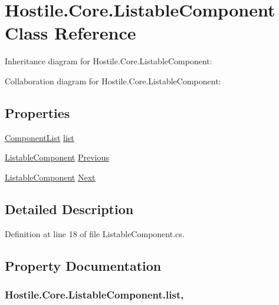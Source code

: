 \hypertarget{class_hostile_1_1_core_1_1_listable_component}{\section{Hostile.\-Core.\-Listable\-Component Class Reference}
\label{class_hostile_1_1_core_1_1_listable_component}
}


Inheritance diagram for Hostile.\-Core.\-Listable\-Component\-:


Collaboration diagram for Hostile.\-Core.\-Listable\-Component\-:
\subsection*{Properties}
\begin{DoxyCompactItemize}
\item 
\hyperlink{class_hostile_1_1_core_1_1_component_list}{Component\-List} \hyperlink{class_hostile_1_1_core_1_1_listable_component_ac5add9a4abc7969e44633099857e194c}{list}
\item 
\hyperlink{class_hostile_1_1_core_1_1_listable_component}{Listable\-Component} \hyperlink{class_hostile_1_1_core_1_1_listable_component_adc5c06457ac3a0d21602349789adb7fc}{Previous}
\item 
\hyperlink{class_hostile_1_1_core_1_1_listable_component}{Listable\-Component} \hyperlink{class_hostile_1_1_core_1_1_listable_component_a8983c35cc8a49a5e43d143ae9b4929bd}{Next}
\end{DoxyCompactItemize}


\subsection{Detailed Description}


Definition at line 18 of file Listable\-Component.\-cs.



\subsection{Property Documentation}
\hypertarget{class_hostile_1_1_core_1_1_listable_component_ac5add9a4abc7969e44633099857e194c}{
\subsubsection[{list}]{ Hostile.\-Core.\-Listable\-Component.\-list\hspace{0.3cm}{\ttfamily [get]}, {\ttfamily [set]}}}\label{class_hostile_1_1_core_1_1_listable_component_ac5add9a4abc7969e44633099857e194c}


